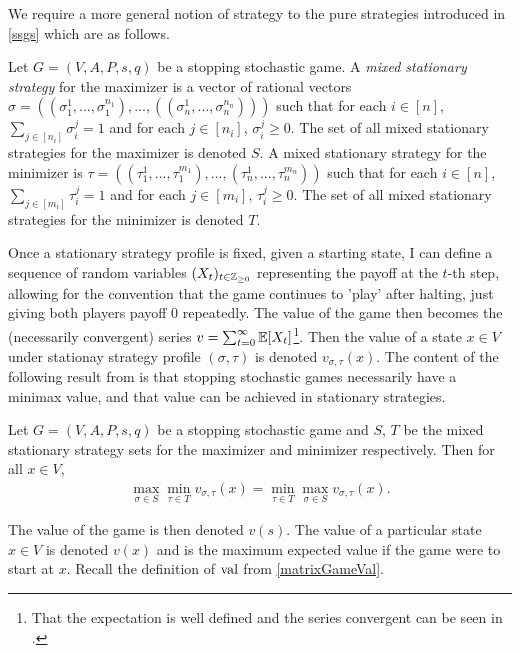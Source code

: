 We require a more general notion of strategy to the pure strategies introduced in \cref{ssgs} which
are as follows.
\begin{definition}
  Let $G = (V, A, P, s, q)$ be a stopping stochastic game. A \emph{mixed stationary strategy}
  for the maximizer is a vector of rational vectors 
  $\sigma = ((\sigma_1^{1}, ..., \sigma_1^{n_1}), ..., ((\sigma_n^{1}, ..., \sigma_n^{n_n})))$ such
  that for each $i \in [n]$, $\sum_{j \in [n_i]} \sigma_i^j = 1$ and for each $j \in [n_i]$, $\sigma_i^j \geq 0$.
  The set of all mixed stationary strategies for the maximizer is denoted $S$.
  A mixed stationary strategy for the minimizer is 
  $\tau = ((\tau_1^{1}, ..., \tau_1^{m_1}), ..., (\tau_n^{1}, ..., \tau_n^{m_n}))$
  such that for each $i \in [n]$, $\sum_{j \in [m_i]} \tau_i^j = 1$ 
  and for each $j \in [m_i]$, $\tau_i^j \geq 0$.
  The set of all mixed stationary strategies for the minimizer is denoted $T$.
\end{definition}
Once a stationary strategy profile is fixed, given a starting state, 
I can define a sequence of random variables
$(X_t)_{t \in \mathbb{Z}_{\geq 0}}$ representing the payoff at the $t$-th step, allowing for the convention
that the game continues to 'play' after halting, just giving both players payoff 0 repeatedly. The value of the game
then becomes the (necessarily convergent) series $v = \sum_{t = 0}^\infty \mathbb{E}[X_t]$\footnote{
  That the expectation is well defined and the series convergent can be seen in \citep[Chapter 2]{compMdps}.}. Then the value of a state $x \in V$ 
under stationay strategy profile $(\sigma, \tau)$ is denoted $v_{\sigma, \tau}(x)$. The content of the following
result from \citep{shapley} is that stopping stochastic games necessarily have a minimax value, and that value can be achieved
in stationary strategies.
\begin{prop}
  Let $G = (V, A, P, s, q)$ be a stopping stochastic game and $S$, $T$ be the mixed stationary strategy
  sets for the maximizer and minimizer respectively. Then for all $x \in V$, 
  \begin{align*}
    \max_{\sigma \in S} \min_{\tau \in T} v_{\sigma, \tau}(x) = \min_{\tau \in T} \max_{\sigma \in S} v_{\sigma, \tau}(x).
  \end{align*}
\end{prop}
The value of the game is then denoted $v(s)$. The value of a particular state $x \in V$ is denoted $v(x)$
and is the maximum expected value if the game were to start at $x$.
Recall the definition of $\mathrm{val}$ from \cref{matrixGameVal}.
